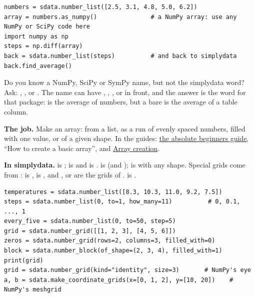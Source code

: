 \begin{lstlisting}[style=py]
numbers = sdata.number_list([2.5, 3.1, 4.8, 5.0, 6.2])
array = numbers.as_numpy()               # a NumPy array: use any NumPy or SciPy code here
import numpy as np
steps = np.diff(array)
back = sdata.number_list(steps)          # and back to simplydata
back.find_average()
\end{lstlisting}

Do you know a NumPy, SciPy or SymPy name, but not the simplydata word? Ask:
, , 
or . The name can have , ,
,  or  in front, and the answer is the word for that package:
 is the average of numbers, but a bare  is the average of a table column.


\textbf{The job.} Make an array: from a list, as a run of evenly spaced numbers, filled with one
value, or of a given shape. In the guides:
\href{https://numpy.org/doc/stable/user/absolute_beginners.html}{the absolute beginners guide}, ``How
to create a basic array'', and \href{https://numpy.org/doc/stable/user/basics.creation.html}{Array
creation}.

\textbf{In simplydata.}  is ;  is  and  is .
 is  (and );
 is  with any shape.
Special grids come from :  is ,
 is , and ,  or  are the
grids of .  is .

\begin{lstlisting}[style=py]
temperatures = sdata.number_list([8.3, 10.3, 11.0, 9.2, 7.5])
steps = sdata.number_list(0, to=1, how_many=11)          # 0, 0.1, ..., 1
every_five = sdata.number_list(0, to=50, step=5)
grid = sdata.number_grid([[1, 2, 3], [4, 5, 6]])
zeros = sdata.number_grid(rows=2, columns=3, filled_with=0)
block = sdata.number_block(of_shape=(2, 3, 4), filled_with=1)
print(grid)
grid = sdata.number_grid(kind="identity", size=3)       # NumPy's eye
a, b = sdata.make_coordinate_grids(x=[0, 1, 2], y=[10, 20])    # NumPy's meshgrid
\end{lstlisting}

